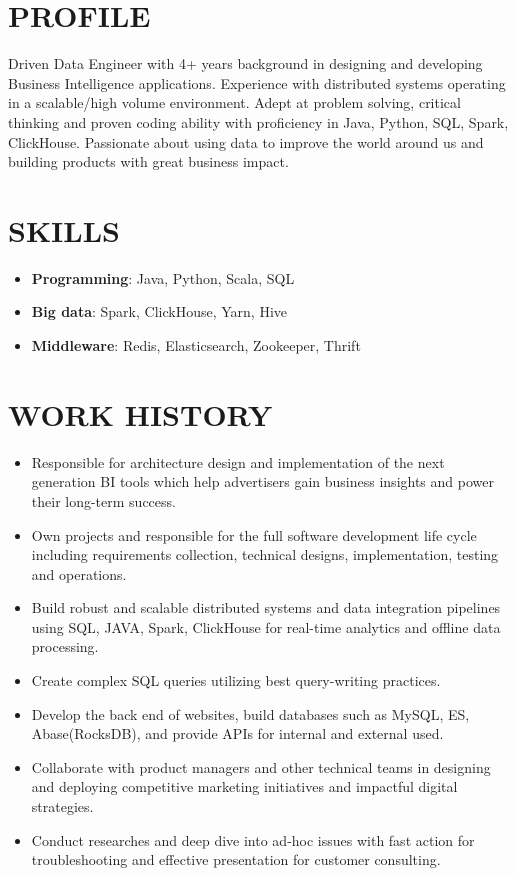 \documentclass{resume}
\begin{document}

 
\section{PROFILE}
Driven Data Engineer with 4+ years background in designing and developing Business Intelligence applications.
Experience with distributed systems operating in a scalable/high volume environment.
Adept at problem solving, critical thinking and proven coding ability with proficiency in Java, Python, SQL, Spark, ClickHouse.
Passionate about using data to improve the world around us and building products with great business impact.

\section{SKILLS}
\begin{itemize}[parsep=0.2ex]
  \item \textbf{Programming}: Java, Python, Scala, SQL
  \item \textbf{Big data}: Spark, ClickHouse, Yarn, Hive
  \item \textbf{Middleware}: Redis, Elasticsearch, Zookeeper, Thrift
\end{itemize}

\section{WORK HISTORY}
\begin{itemize}
  \item Responsible for architecture design and implementation of the next generation BI tools 
  which help advertisers gain business insights and power their long-term success.
  \item Own projects and responsible for the full software development life cycle 
  including requirements collection, technical designs, implementation, testing and operations.
  \item Build robust and scalable distributed systems and data integration pipelines 
  using SQL, JAVA, Spark, ClickHouse for real-time analytics and offline data processing. 
  \item Create complex SQL queries utilizing best query-writing practices.
  \item Develop the back end of websites, build databases such as MySQL, ES, Abase(RocksDB), and provide APIs for internal and external used.
  \item Collaborate with product managers and other technical teams in designing and deploying competitive marketing initiatives and impactful digital strategies.
  \item Conduct researches and deep dive into ad-hoc issues with fast action for troubleshooting and effective presentation for customer consulting.
  
\end{itemize}
\end{document}
